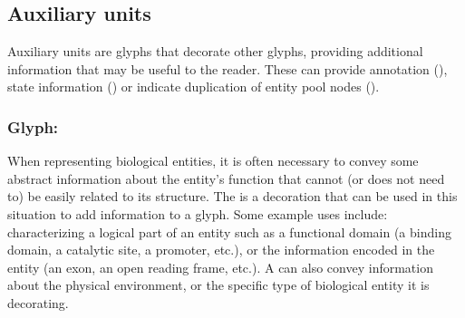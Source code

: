 


\subsection{Auxiliary units}

Auxiliary units are glyphs that decorate other glyphs, providing additional information that may be useful to the reader. These can provide annotation (), state information () or indicate duplication of entity pool nodes ().

\subsubsection{Glyph: }
\label{sec:unitInfo}

When representing biological entities, it is often necessary to convey some abstract information about the entity's function that cannot (or does not need to) be easily related to its structure.  The  is a decoration that can be used in this situation to add information to a glyph.  Some example uses include: characterizing a logical part of an entity such as a functional domain (a binding domain, a catalytic site, a promoter, etc.), or the information encoded in the entity (an exon, an open reading frame, etc.).  A  can also convey information about the physical environment, or the specific type of biological entity it is decorating.

